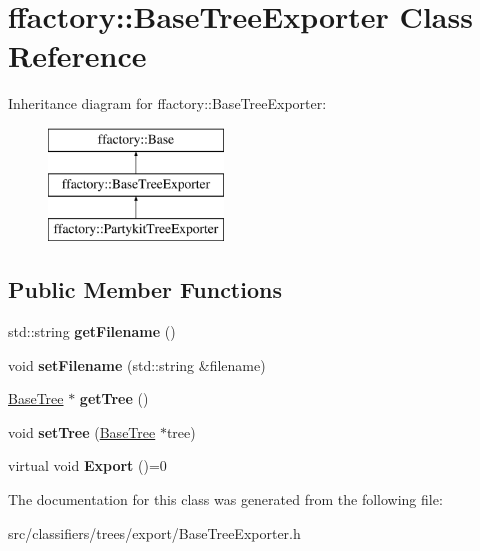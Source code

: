 \hypertarget{classffactory_1_1_base_tree_exporter}{\section{ffactory\-:\-:Base\-Tree\-Exporter Class Reference}
\label{classffactory_1_1_base_tree_exporter}
}
Inheritance diagram for ffactory\-:\-:Base\-Tree\-Exporter\-:\begin{figure}[H]
\begin{center}
\leavevmode
\includegraphics[height=3.000000cm]{classffactory_1_1_base_tree_exporter}
\end{center}
\end{figure}
\subsection*{Public Member Functions}
\begin{DoxyCompactItemize}
\item 
\hypertarget{classffactory_1_1_base_tree_exporter_ae2915d56c4b1da44cd610d205e20a4b4}{std\-::string {\bfseries get\-Filename} ()}\label{classffactory_1_1_base_tree_exporter_ae2915d56c4b1da44cd610d205e20a4b4}

\item 
\hypertarget{classffactory_1_1_base_tree_exporter_ad24336364f470e15670b823daf4e00a9}{void {\bfseries set\-Filename} (std\-::string \&filename)}\label{classffactory_1_1_base_tree_exporter_ad24336364f470e15670b823daf4e00a9}

\item 
\hypertarget{classffactory_1_1_base_tree_exporter_a94b7d461624b417a6955472e5d9304fc}{\hyperlink{classffactory_1_1_base_tree}{Base\-Tree} $\ast$ {\bfseries get\-Tree} ()}\label{classffactory_1_1_base_tree_exporter_a94b7d461624b417a6955472e5d9304fc}

\item 
\hypertarget{classffactory_1_1_base_tree_exporter_a05b3479434f4c27f7e462a06aec99e3d}{void {\bfseries set\-Tree} (\hyperlink{classffactory_1_1_base_tree}{Base\-Tree} $\ast$tree)}\label{classffactory_1_1_base_tree_exporter_a05b3479434f4c27f7e462a06aec99e3d}

\item 
\hypertarget{classffactory_1_1_base_tree_exporter_a7ce46289b3e47e85cb43e9ff4e5d65fc}{virtual void {\bfseries Export} ()=0}\label{classffactory_1_1_base_tree_exporter_a7ce46289b3e47e85cb43e9ff4e5d65fc}

\end{DoxyCompactItemize}


The documentation for this class was generated from the following file\-:\begin{DoxyCompactItemize}
\item 
src/classifiers/trees/export/Base\-Tree\-Exporter.\-h\end{DoxyCompactItemize}
